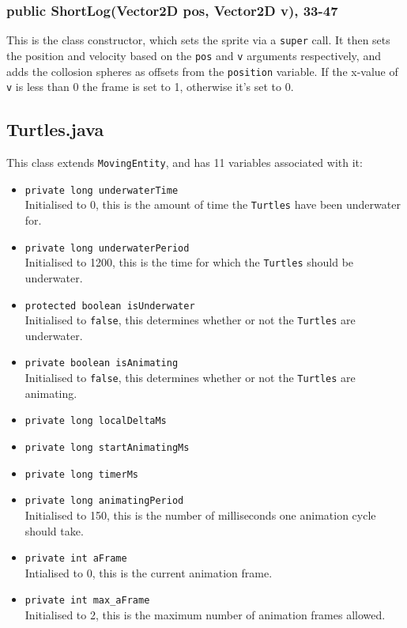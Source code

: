 \documentclass[12pt]{article}
\begin{document}
\subsubsection{public ShortLog(Vector2D pos, Vector2D v), 33-47}
This is the class constructor, which sets the sprite via a \verb|super| call.
It then sets the position and velocity based on the \verb|pos| and \verb|v| arguments respectively, and adds the collosion spheres as offsets from the \verb|position| variable.
If the x-value of \verb|v| is less than 0 the frame is set to 1, otherwise it's set to 0.

\subsection{Turtles.java}
This class extends \verb|MovingEntity|, and has 11 variables associated with it:
\begin{itemize}
  \item \verb|private long underwaterTime|\\
        Initialised to 0, this is the amount of time the \verb|Turtles| have been underwater for.
  \item \verb|private long underwaterPeriod|\\
        Initialised to 1200, this is the time for which the \verb|Turtles| should be underwater.
  \item \verb|protected boolean isUnderwater|\\
        Initialised to \verb|false|, this determines whether or not the \verb|Turtles| are underwater.
  \item \verb|private boolean isAnimating|\\
        Initialised to \verb|false|, this determines whether or not the \verb|Turtles| are animating.
  \item \verb|private long localDeltaMs|\\
        
  \item \verb|private long startAnimatingMs|\\
  \item \verb|private long timerMs|\\
  \item \verb|private long animatingPeriod|\\
        Initialised to 150, this is the number of milliseconds one animation cycle should take.
  \item \verb|private int aFrame|\\
        Intialised to 0, this is the current animation frame.
  \item \verb|private int max_aFrame|\\
        Initialised to 2, this is the maximum number of animation frames allowed.
\end{itemize}
\end{document}
